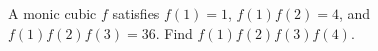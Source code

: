 A monic cubic $f$ satisfies $f(1)=1$, $f(1)f(2)=4$, and $f(1)f(2)f(3)=36$. Find $f(1)f(2)f(3)f(4)$.
